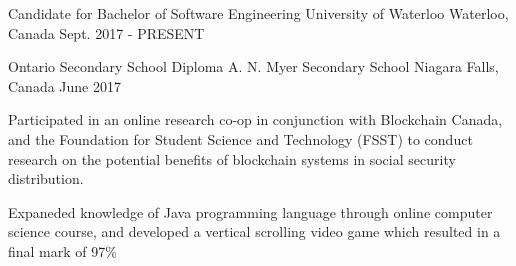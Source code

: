 \begin{cventries}
  	\cventry
    {Candidate for Bachelor of Software Engineering}
    {University of Waterloo}
    {Waterloo, Canada}
    {Sept. 2017 - PRESENT}
    {}
    
    \cventry
    {Ontario Secondary School Diploma}
    {A. N. Myer Secondary School}
    {Niagara Falls, Canada}
    {June 2017}
    {
    \begin{cvitems}
	\item {Participated in an online research co-op in conjunction with Blockchain Canada, and the Foundation for Student Science and Technology (FSST) to conduct research on the potential benefits of blockchain systems in social security distribution.}
	\item {Expaneded knowledge of Java programming language through online computer science course, and developed a vertical scrolling video game which resulted in a final mark of 97\%}    
    \end{cvitems} 
    }
\end{cventries}
